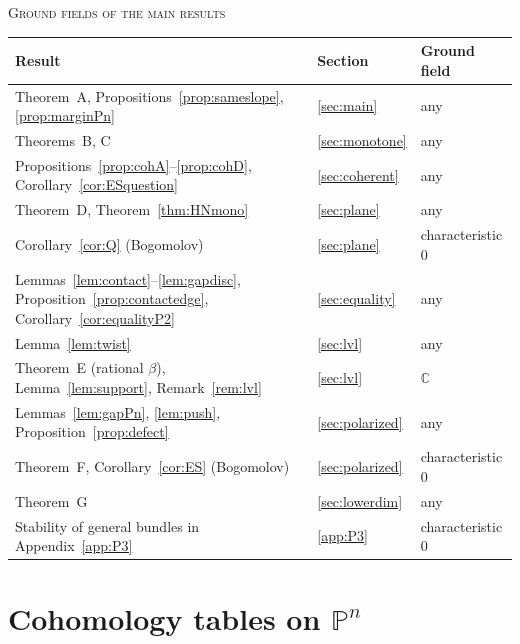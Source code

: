 \documentclass[11pt]{amsart}
\theoremstyle{definition}
\theoremstyle{remark}
\newcommand{\PP}{\mathbb{P}}
\begin{document}
\begin{table}[ht]\centering\small
\textsc{Ground fields of the main results}\par\smallskip
\begin{tabular}{@{}lll@{}}
\toprule
Result & Section & Ground field\\
\midrule
Theorem~A, Propositions~\ref{prop:sameslope}, \ref{prop:marginPn} & \ref{sec:main} & any\\
Theorems~B, C & \ref{sec:monotone} & any\\
Propositions~\ref{prop:cohA}--\ref{prop:cohD}, Corollary~\ref{cor:ESquestion} & \ref{sec:coherent} & any\\
Theorem~D, Theorem~\ref{thm:HNmono} & \ref{sec:plane} & any\\
Corollary~\ref{cor:Q} (Bogomolov) & \ref{sec:plane} & characteristic $0$\\
Lemmas~\ref{lem:contact}--\ref{lem:gapdisc}, Proposition~\ref{prop:contactedge}, Corollary~\ref{cor:equalityP2} & \ref{sec:equality} & any\\
Lemma~\ref{lem:twist} & \ref{sec:lvl} & any\\
Theorem~E (rational $\beta$), Lemma~\ref{lem:support}, Remark~\ref{rem:lvl} & \ref{sec:lvl} & $\mathbb C$\\
Lemmas~\ref{lem:gapPn}, \ref{lem:push}, Proposition~\ref{prop:defect} & \ref{sec:polarized} & any\\
Theorem~F, Corollary~\ref{cor:ES} (Bogomolov) & \ref{sec:polarized} & characteristic $0$\\
Theorem~G & \ref{sec:lowerdim} & any\\
Stability of general bundles in Appendix~\ref{app:P3} & \ref{app:P3} & characteristic $0$\\
\bottomrule
\end{tabular}
\end{table}

\section{Cohomology tables on \texorpdfstring{$\PP^n$}{Pn}}\label{sec:tables}
\end{document}

